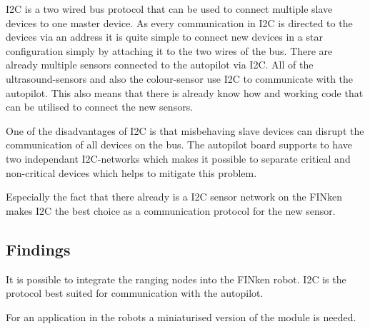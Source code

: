 I2C is a two wired bus protocol that can be used to connect multiple slave devices to one master device.
As every communication in I2C is directed to the devices via an address it is quite simple to connect new devices in a star configuration simply by attaching it to the two wires of the bus.
There are already multiple sensors connected to the autopilot via I2C.
All of the ultrasound-sensors and also the colour-sensor use I2C to communicate with the autopilot.
This also means that there is already know how and working code that can be utilised to connect the new sensors.

One of the disadvantages of I2C is that misbehaving slave devices can disrupt the communication of all devices on the bus.
The autopilot board supports to have two independant I2C-networks which makes it possible to separate critical and non-critical devices which helps to mitigate this problem.

Especially the fact that there already is a I2C sensor network on the FINken makes I2C the best choice as a communication protocol for the new sensor.

\subsection{Findings}

It is possible to integrate the ranging nodes into the FINken robot.
I2C is the protocol best suited for communication with the autopilot.

For an application in the robots a miniaturised version of the module is needed.
